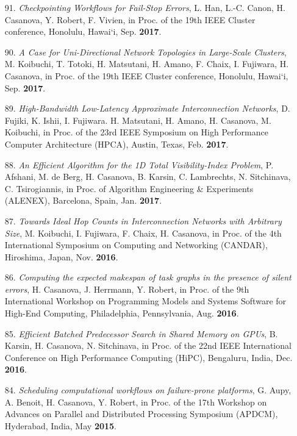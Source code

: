 \begin{enumerate}
\item [91.] {\it Checkpointing Workflows for Fail-Stop Errors},
L. Han, L.-C. Canon, H. Casanova, Y. Robert, F. Vivien, 
in Proc. of the 19th IEEE Cluster conference, Honolulu, Hawai`i, Sep. {\bf 2017}. 

\item [90.] {\it A Case for Uni-Directional Network Topologies in Large-Scale Clusters}, 
M. Koibuchi, T. Totoki, H. Matsutani, H. Amano, F. Chaix, I. Fujiwara, H. Casanova, 
in Proc. of the 19th IEEE Cluster conference, Honolulu, Hawai`i, Sep. {\bf 2017}. 

\item [89.] {\it High-Bandwidth Low-Latency Approximate Interconnection
Networks}, D. Fujiki, K. Ishii, I. Fujiwara. H. Matsutani, H. Amano, H.
Casanova, M. Koibuchi, in Proc. of the 23rd IEEE Symposium on High
Performance Computer Architecture (HPCA), Austin, Texas, Feb. {\bf 2017}.

\item [88.] {\it An Efficient Algorithm for the 1D Total Visibility-Index
Problem}, P. Afshani, M. de Berg, H. Casanova, B. Karsin, C. Lambrechts, N.
Sitchinava, C. Tsirogiannis, in Proc. of Algorithm Engineering \&
Experiments (ALENEX), Barcelona, Spain, Jan. {\bf 2017}.

\item [87.] {\it  Towards Ideal Hop Counts in Interconnection Networks with
Arbitrary Size}, M. Koibuchi, I. Fujiwara, F. Chaix, H. Casanova, in Proc.
of the 4th International Symposium on Computing and Networking (CANDAR),
Hiroshima, Japan, Nov.  {\bf 2016}.

\item [86.] {\it Computing the expected makespan of task graphs in the presence of silent errors},
H. Casanova, J. Herrmann, Y. Robert,
in Proc. of the 9th International Workshop on Programming Models and Systems Software for High-End Computing, Philadelphia, Pennsylvania, Aug. {\bf 2016}.


\item [85.] {\it Efficient Batched Predecessor Search in Shared Memory on GPUs},
B. Karsin, H. Casanova, N. Sitchinava, in Proc. of 
the 22nd IEEE International Conference on High Performance Computing (HiPC),
Bengaluru, India, Dec. {\bf 2016}. 

\item [84.] {\it Scheduling computational workflows on failure-prone
platforms}, G. Aupy, A. Benoit, H. Casanova, Y.  Robert, in Proc. of
the 17th Workshop on Advances on Parallel and Distributed Processing
Symposium (APDCM), Hyderabad, India, May {\bf 2015}.




\end{enumerate}
